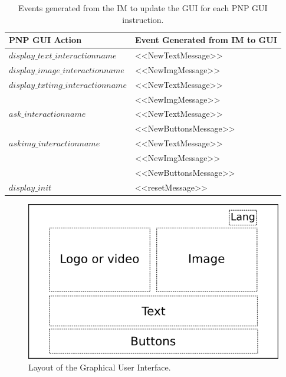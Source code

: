 \documentclass[11pt,a4paper]{article}
\begin{document}
\begin{table}[h]
\begin{center}
  \begin{tabular}{| l | l |}
    \hline
    \textbf{PNP GUI Action} & \textbf{Event Generated from IM to GUI} \\ \hline
    $display\_text\_interactionname$ & {\ttfamily <<NewTextMessage>>} \\ \hline
    $display\_image\_interactionname$ & {\ttfamily <<NewImgMessage>>} \\ \hline
    $display\_txtimg\_interactionname$ & {\ttfamily <<NewTextMessage>>} \\
    & {\ttfamily <<NewImgMessage>>}\\ \hline
    $ask\_interactionname$ & {\ttfamily <<NewTextMessage>>}\\
    & {\ttfamily <<NewButtonsMessage>>}\\ \hline
    $askimg\_interactionname$ & {\ttfamily <<NewTextMessage>>} \\
    & {\ttfamily <<NewImgMessage>>}\\
    & {\ttfamily <<NewButtonsMessage>>}\\ \hline
    $display\_init$ & {\ttfamily <<resetMessage>>} \\
    \hline
  \end{tabular}
\end{center}
    \caption{Events generated from the IM to update the GUI for each PNP GUI instruction.}
    \label{tab:PNPGUIeventsrelation}   
\end{table}

\begin{figure}[!t]
\centering
\includegraphics[width=.6\columnwidth]{img/GUIlayout.png}
\caption{Layout of the Graphical User Interface.}
\label{fig:GUIlayout}
\end{figure}
\end{document}
